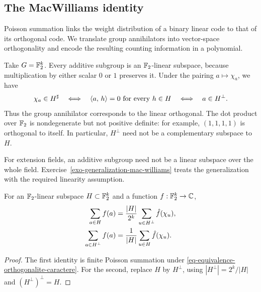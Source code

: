 \subsection{The MacWilliams identity}
\label{sect2-application-id-mac-williams}

Poisson summation links the weight distribution of a binary linear code to
that of its orthogonal code. We translate group annihilators into
vector-space orthogonality and encode the resulting counting information in
a polynomial.

Take $G=\mathbb{F}_2^k$. Every additive subgroup is an $\mathbb{F}_2$-linear subspace,
because multiplication by either scalar $0$ or $1$ preserves it.
Under the pairing $a\mapsto\chi_a$, we have
\begin{equation}
\label{eq-equivalence-orthogonalite-caractere}
 \chi_a\in H^\sharp
 \quad\Longleftrightarrow\quad
 \langle a,\,h\rangle=0\text{ for every }h\in H
 \quad\Longleftrightarrow\quad a\in H^\perp.
\end{equation}
Thus the group annihilator corresponds to the linear orthogonal.
The dot product over $\mathbb{F}_2$ is nondegenerate but not positive definite:
for example, $(1,1,1,1)$ is orthogonal to itself. In particular, $H^\perp$
need not be a complementary subspace to $H$.

For extension fields, an additive subgroup need not be a linear subspace
over the whole field. Exercise~\ref{exo-generalization-mac-williams} treats
the generalization with the required linearity assumption.


\begin{prop}
\label{prop-formula-vector-fish}
For an $\mathbb{F}_2$-linear subspace $H\subset\mathbb{F}_2^k$ and a function
$f:\mathbb{F}_2^k\to\mathbb{C}$,
\begin{align}
\label{eq-formula-fish-vector-1}
 \sum_{a\in H}f(a)&=\frac{|H|}{2^k}
                         \sum_{u\in H^\perp}\hat{f}(\chi_u),\\
\label{eq-formula-vector-fish-2}
 \sum_{a\in H^\perp}f(a)&=\frac1{|H|}
                         \sum_{u\in H}\hat{f}(\chi_u).
\end{align}
\end{prop}
\begin{proof}
The first identity is finite Poisson summation under
\eqref{eq-equivalence-orthogonalite-caractere}.
For the second, replace $H$ by $H^\perp$, using
$|H^\perp|=2^k/|H|$ and $(H^\perp)^\perp=H$.
\end{proof}

